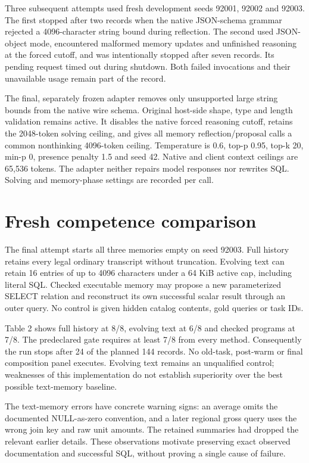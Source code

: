 \documentclass[10pt,twocolumn]{article}
\begin{document}
Three subsequent attempts used fresh development seeds 92001, 92002 and 92003.
The first stopped after two records when the native JSON-schema grammar rejected
a 4096-character string bound during reflection. The second used JSON-object
mode, encountered malformed memory updates and unfinished reasoning at the
forced cutoff, and was intentionally stopped after seven records. Its pending
request timed out during shutdown. Both failed invocations and their unavailable
usage remain part of the record.

The final, separately frozen adapter removes only unsupported large string
bounds from the native wire schema. Original host-side shape, type and length
validation remains active. It disables the native forced reasoning cutoff,
retains the 2048-token solving ceiling, and gives all memory reflection/proposal
calls a common nonthinking 4096-token ceiling. Temperature is 0.6, top-p 0.95,
top-k 20, min-p 0, presence penalty 1.5 and seed 42. Native and client context
ceilings are 65,536 tokens. The adapter neither repairs model responses nor
rewrites SQL. Solving and memory-phase settings are recorded per call.

\section{Fresh competence comparison}

The final attempt starts all three memories empty on seed 92003. Full history
retains every legal ordinary transcript without truncation. Evolving text can
retain 16 entries of up to 4096 characters under a 64 KiB active cap, including
literal SQL. Checked executable memory may propose a new parameterized SELECT
relation and reconstruct its own successful scalar result through an outer
query. No control is given hidden catalog contents, gold queries or task IDs.

Table 2 shows full history at 8/8, evolving text at 6/8 and checked programs at
7/8. The predeclared gate requires at least 7/8 from every method. Consequently
the run stops after 24 of the planned 144 records. No old-task, post-warm or final
composition panel executes. Evolving text remains an unqualified control;
weaknesses of this implementation do not establish superiority over the best
possible text-memory baseline.

The text-memory errors have concrete warning signs: an average omits the
documented NULL-as-zero convention, and a later regional gross query uses the
wrong join key and raw unit amounts. The retained summaries had dropped the
relevant earlier details. These observations motivate preserving exact observed
documentation and successful SQL, without proving a single cause of failure.
\end{document}
